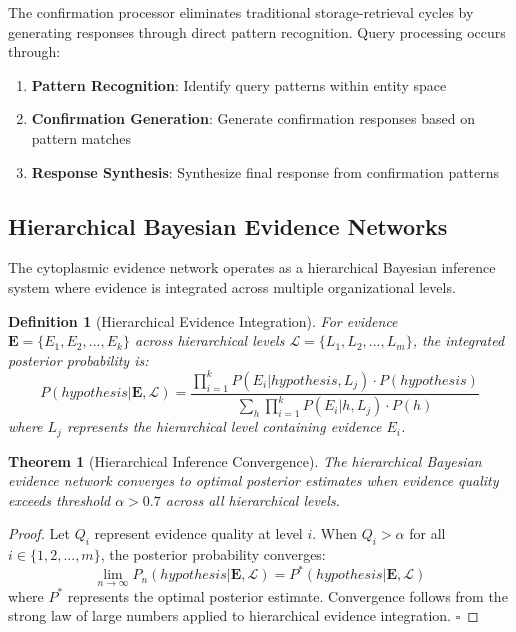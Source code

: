 \documentclass[12pt,a4paper]{article}
\newtheorem{theorem}{Theorem}
\newtheorem{definition}{Definition}
\begin{document}
The confirmation processor eliminates traditional storage-retrieval cycles by generating responses through direct pattern recognition. Query processing occurs through:

\begin{enumerate}
\item \textbf{Pattern Recognition}: Identify query patterns within entity space
\item \textbf{Confirmation Generation}: Generate confirmation responses based on pattern matches
\item \textbf{Response Synthesis}: Synthesize final response from confirmation patterns
\end{enumerate}

\subsection{Hierarchical Bayesian Evidence Networks}

The cytoplasmic evidence network operates as a hierarchical Bayesian inference system where evidence is integrated across multiple organizational levels.

\begin{definition}[Hierarchical Evidence Integration]
For evidence $\mathbf{E} = \{E_1, E_2, ..., E_k\}$ across hierarchical levels $\mathcal{L} = \{L_1, L_2, ..., L_m\}$, the integrated posterior probability is:
\begin{equation}
P(hypothesis | \mathbf{E}, \mathcal{L}) = \frac{\prod_{i=1}^{k} P(E_i | hypothesis, L_j) \cdot P(hypothesis)}{\sum_{h} \prod_{i=1}^{k} P(E_i | h, L_j) \cdot P(h)}
\end{equation}
where $L_j$ represents the hierarchical level containing evidence $E_i$.
\end{definition}

\begin{theorem}[Hierarchical Inference Convergence]
The hierarchical Bayesian evidence network converges to optimal posterior estimates when evidence quality exceeds threshold $\alpha > 0.7$ across all hierarchical levels.
\end{theorem}

\begin{proof}
Let $Q_i$ represent evidence quality at level $i$. When $Q_i > \alpha$ for all $i \in \{1, 2, ..., m\}$, the posterior probability converges:
\begin{equation}
\lim_{n \to \infty} P_n(hypothesis | \mathbf{E}, \mathcal{L}) = P^*(hypothesis | \mathbf{E}, \mathcal{L})
\end{equation}
where $P^*$ represents the optimal posterior estimate. Convergence follows from the strong law of large numbers applied to hierarchical evidence integration. $\square$
\end{proof}
\end{document}
